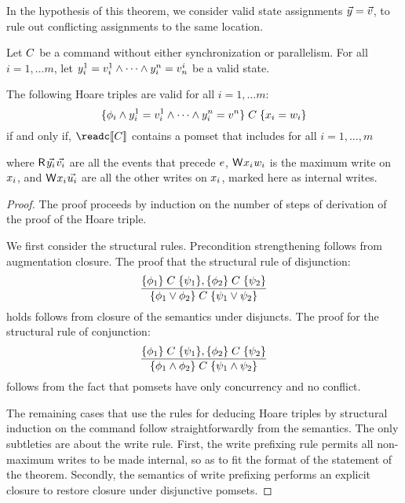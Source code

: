 In the hypothesis of this theorem, we consider valid state assignments $\vec{y} =\vec{v}$, to rule out conflicting assignments to the same location.  
\begin{theorem}\label{hoareGen}
Let $C$ be a command without either synchronization or parallelism.   For all $i=1, \ldots m$, let $y^1_i=v^1_i\land\cdots\land y^n_i=v^i_n$ be a valid state. 

The following Hoare triples are valid for all $i=1, \ldots m$:
\begin{displaymath}
  \{\phi_i\land y^1_i=v^1_i\land\cdots\land y^n_i=v^n\}\allowbreak\;C\;\allowbreak\{x_i=w_i\}  
\end{displaymath}
if and only if, $\readc\sem{\aCmd}$ contains a pomset  that includes for all $i=1, \ldots, m$
\begin{tikzdisplay}[node distance=1em]
\end{tikzdisplay}
where $\DR{\vec{\bLoc_i}}{\vec{\aVal_i}}$ are all the events that precede $e$, $\DW{\aLoc_i}{\bVal_i}$ is the maximum write on $x_i$,  and
$\DW{\aLoc_i}{\vec{\dVal_i}}$ are all the other writes on $x_i$, marked here as internal writes.
\begin{proof}
The proof proceeds by induction on the number of steps of derivation of the proof of the Hoare triple.  

We first consider the structural rules.  Precondition strengthening follows from augmentation closure.    
The proof that the structural rule of disjunction:
\[ \frac{\{\phi_1\}\allowbreak\;C\;\allowbreak\{\psi_1\},  \{\phi_2\}\allowbreak\;C\;\allowbreak\{\psi_2\}}{ \{\phi_1 \lor \phi_2\}\allowbreak\;C\;\allowbreak\{\psi_1\lor \psi_2\}} 
\]
holds  follows from closure of the semantics under disjuncts. The proof for the structural rule of conjunction:
\[ \frac{\{\phi_1\}\allowbreak\;C\;\allowbreak\{\psi_1\},  \{\phi_2\}\allowbreak\;C\;\allowbreak\{\psi_2\}}{ \{\phi_1 \land \phi_2\}\allowbreak\;C\;\allowbreak\{\psi_1\land \psi_2\}} 
\]
follows from the fact that pomsets have only concurrency and no conflict.  

The remaining cases that use the rules for deducing Hoare triples by structural induction on the command follow straightforwardly from the semantics.    The only subtleties are about the write rule.  First, the write prefixing rule permits all non-maximum writes to be made internal, so as to fit the format of the statement of the theorem.  Secondly, the semantics of write prefixing performs  an explicit closure to restore closure under disjunctive pomsets.    
\end{proof}
\end{theorem}



